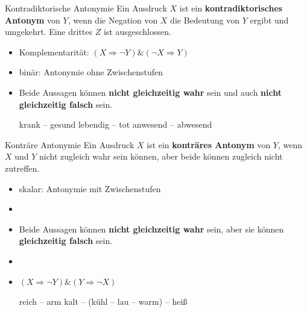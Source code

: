 
\begin{frame}

\begin{block}{Kontradiktorische Antonymie}
Ein Ausdruck $X$ ist ein \textbf{kontradiktorisches Antonym} von $Y$, wenn die Negation von $X$ die Bedeutung von $Y$ ergibt und umgekehrt. Eine drittes $Z$ ist ausgeschlossen.
\end{block}

\begin{itemize}
	\item Komplementarität: $(X \Rightarrow \lnot Y) \& (\lnot X  \Rightarrow Y)$
	\item binär: Antonymie ohne Zwischenstufen
	\item Beide Aussagen können \textbf{nicht gleichzeitig wahr} sein und auch \textbf{nicht gleichzeitig falsch} sein.
	
	\eal
		\ex krank -- gesund
		\ex lebendig -- tot
		\ex anwesend -- abwesend
	\zl
	
\end{itemize}

\end{frame}



\begin{frame}

\begin{block}{Konträre Antonymie}
Ein Ausdruck $X$ ist ein \textbf{konträres Antonym} von $Y$, wenn $X$ und $Y$ nicht zugleich wahr sein können, aber beide können zugleich nicht zutreffen.
\end{block}

\begin{itemize}
	\item skalar: Antonymie mit Zwischenstufen
	\item[]
	\item Beide Aussagen können \textbf{nicht gleichzeitig wahr} sein, aber sie können \textbf{gleichzeitig falsch} sein.
	\item[]
	\item $(X \Rightarrow \lnot Y) \& (Y \Rightarrow \lnot X)$
	
	\eal
		\ex reich -- arm
		\ex kalt -- (kühl -- lau -- warm) -- heiß
	\zl
	
\end{itemize}

\end{frame}


